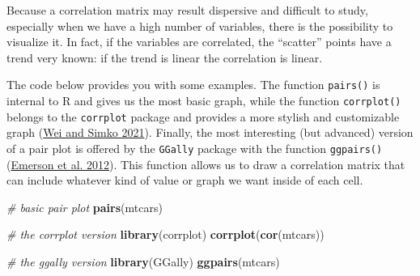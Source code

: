 \documentclass[
]{svmono}
\newenvironment{Shaded}{\begin{snugshade}}{\end{snugshade}}
\newcommand{\AttributeTok}[1]{\textcolor[rgb]{0.13,0.29,0.53}{#1}}
\newcommand{\CommentTok}[1]{\textcolor[rgb]{0.56,0.35,0.01}{\textit{#1}}}
\newcommand{\DecValTok}[1]{\textcolor[rgb]{0.00,0.00,0.81}{#1}}
\newcommand{\FunctionTok}[1]{\textcolor[rgb]{0.13,0.29,0.53}{\textbf{#1}}}
\newcommand{\NormalTok}[1]{#1}
\newcommand{\SpecialCharTok}[1]{\textcolor[rgb]{0.81,0.36,0.00}{\textbf{#1}}}
\newcommand{\StringTok}[1]{\textcolor[rgb]{0.31,0.60,0.02}{#1}}
\begin{document}
\begin{Shaded}
\end{Shaded}

Because a correlation matrix may result dispersive and difficult to
study, especially when we have a high number of variables, there is the
possibility to visualize it. In fact, if the variables are correlated,
the ``scatter'' points have a trend very known: if the trend is linear the
correlation is linear.

The code below provides you with some examples. The function \texttt{pairs()}
is internal to R and gives us the most basic graph, while the function
\texttt{corrplot()} belongs to the \texttt{corrplot} package and provides a more
stylish and customizable graph (\protect\hyperlink{ref-wei2021}{Wei and Simko 2021}). Finally, the most interesting
(but advanced) version of a pair plot is offered by the \texttt{GGally} package
with the function \texttt{ggpairs()}(\protect\hyperlink{ref-emerson2012}{Emerson et al. 2012}). This function allows us to
draw a correlation matrix that can include whatever kind of value or
graph we want inside of each cell.

\begin{Shaded}
\begin{Highlighting}[]
\CommentTok{\# basic pair plot}
\FunctionTok{pairs}\NormalTok{(mtcars)}

\CommentTok{\# the corrplot version}
\FunctionTok{library}\NormalTok{(corrplot)}
\FunctionTok{corrplot}\NormalTok{(}\FunctionTok{cor}\NormalTok{(mtcars))}

\CommentTok{\# the ggally version}
\FunctionTok{library}\NormalTok{(GGally)}
\FunctionTok{ggpairs}\NormalTok{(mtcars)}
\end{Highlighting}
\end{Shaded}
\end{document}
